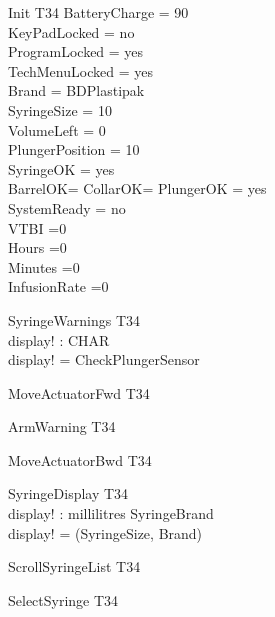 \documentclass[landscape]{article}
\begin{document}
\begin{schema}{Init}
T34
\where
BatteryCharge = 90\\
KeyPadLocked = no\\
ProgramLocked = yes \\
TechMenuLocked = yes\\
Brand = BDPlastipak\\ 
SyringeSize = 10\\
VolumeLeft = 0\\
PlungerPosition = 10 \\
SyringeOK = yes\\
BarrelOK= CollarOK= PlungerOK = yes\\
SystemReady = no\\
VTBI =0\\
Hours =0\\
Minutes =0\\
InfusionRate =0
\end{schema}

\begin{schema}{SyringeWarnings}
\Xi T34\\
display! : CHAR\\
\where
display! = CheckPlungerSensor\\
\end{schema}

\begin{schema} {MoveActuatorFwd}
\Xi T34
\end{schema}

\begin{schema} {ArmWarning}
\Xi T34
\end{schema}

\begin{schema} {MoveActuatorBwd}
\Xi T34
\end{schema}

\begin{schema}{SyringeDisplay}
\Xi T34\\
display! : millilitres \cross SyringeBrand\\
\where
display! = (SyringeSize, Brand)\\
\end{schema}

\begin{schema} {ScrollSyringeList}
\Xi T34
\end{schema}

\begin{schema} {SelectSyringe}
\Xi T34
\end{schema}
\end{document}
